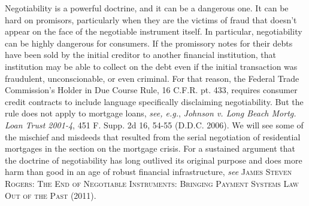 Negotiability is a powerful doctrine, and it can be a dangerous one. It can be
hard on promisors, particularly when they are the victims of fraud that doesn't
appear on the face of the negotiable instrument itself. In particular,
negotiability can be highly dangerous for consumers. If the promissory notes
for their debts have been sold by the initial creditor to another financial
institution, that institution may be able to collect on the debt even if the
initial transaction was fraudulent, unconscionable, or even criminal. For that
reason, the Federal Trade Commission's Holder in Due Course Rule, 16 C.F.R. pt.
433, requires consumer credit contracts to include language specifically
disclaiming negotiability. But the rule does not apply to mortgage loans,
\textit{see, e.g.}, \emph{Johnson v. Long Beach Mortg. Loan Trust 2001-4}, 451
F.
Supp. 2d 16, 54-55 (D.D.C. 2006). We will see some of the mischief and misdeeds
that resulted from the serial negotiation of residential mortgages in the
section on the mortgage crisis. For a sustained argument that the doctrine of
negotiability has long outlived its original purpose and does more harm than
good in an age of robust financial infrastructure, \emph{see}
\textsc{James Steven Rogers: The End of Negotiable
Instruments: Bringing Payment Systems Law Out of the Past} (2011).


